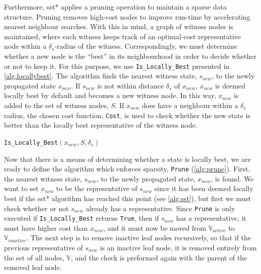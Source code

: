 Furthermore, \gls{sst}* applies a pruning operation to maintain a sparse data structure. Pruning removes high-cost nodes to improve run-time by accelerating nearest neighbour searches. With this in mind, a graph of witness nodes is maintained, where each witness keeps track of an optimal-cost representative node within a $\delta_s$-radius of the witness. Correspondingly, we must determine whether a new node is the ``best'' in its neighbourhood in order to decide whether or not to keep it. For this purpose, we use \texttt{Is\_Locally\_Best} presented in \autoref{alg:locallybest}. The algorithm finds the nearest witness state, $s_{new}$, to the newly propagated state $x_{new}$. If $s_{new}$ is not within distance $\delta_s$ of $x_{new}$, $x_{new}$ is deemed locally best by default and becomes a new witness node. In this way, $x_{new}$ is added to the set of witness nodes, $S$. If $x_{new}$ does have a neighbour within a $\delta_s$ radius, the chosen cost function, \texttt{Cost}, is used to check whether the new state is better than the locally best representative of the witness node.

\begin{algorithm}
\caption{\texttt{Is\_Locally\_Best}$(x_{new}, S, \delta_s)$}
\label{alg:locallybest}
\begin{algorithmic}[1]
    \EndIf{}
    \EndIf{}
\end{algorithmic}{}
\end{algorithm}

Now that there is a means of determining whether a state is locally best, we are ready to define the algorithm which enforces sparsity, \texttt{Prune} (\autoref{alg:prune}). First, the nearest witness state, $s_{new}$, to the newly propagated state, $x_{new}$, is found. We want to set $x_{new}$ to be the representative of $s_{new}$ since it has been deemed locally best if the \gls{sst}* algorithm has reached this point (see \autoref{alg:sst}), but first we must check whether or not $s_{new}$ already has a representative. Since \texttt{Prune} is only executed if \texttt{Is\_Locally\_Best} returns \texttt{True}, then if $s_{new}$ has a representative, it must have higher cost than $x_{new}$, and it must now be moved from $\mathbb{V}_{active}$ to $\mathbb{V}_{inactive}$. The next step is to remove inactive leaf nodes recursively, so that if the previous representative of $s_{new}$ is an inactive leaf node, it is removed entirely from the set of all nodes, $\mathbb{V}$, and the check is preformed again with the parent of the removed leaf node.


